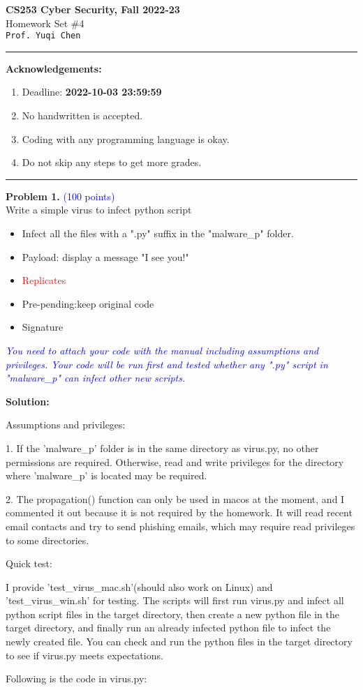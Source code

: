 \documentclass[english,onecolumn]{IEEEtran}
\begin{document}
\begin{center}
	\large{\textbf{CS253 Cyber Security, Fall 2022-23}}\\
	Homework Set \#4\\
	\texttt{Prof. Yuqi Chen } 
\par\end{center}

\noindent
\rule{\linewidth}{0.4pt}
{\bf Acknowledgements:}
\begin{enumerate}
	\item Deadline: {\bf 2022-10-03 23:59:59}
	\item No handwritten is accepted.
	\item Coding with any programming language is okay.
	\item Do not skip any steps to get more grades.
\end{enumerate}
\rule{\linewidth}{0.4pt}

\noindent\textbf{Problem 1.}  \textcolor{blue}{(100 points)} \\
Write a simple virus to infect python script
\begin{itemize}
	\item Infect all the files with a ".py" suffix in the "malware\_p" folder.
	\item Payload: display a message "I see you!"
	\item \textcolor{red}{Replicates}
	\item Pre-pending:keep original code
	\item Signature
\end{itemize}
\textcolor{blue}{\textit{You need to attach your code with the manual including assumptions and privileges. Your code will be run first and tested whether any ".py" script in "malware\_p" can infect other new scripts.}}

\noindent\textbf{Solution: }

Assumptions and privileges:

1. If the 'malware\_p' folder is in the same directory as virus.py, no other permissions are required. Otherwise, read and write privileges for the directory where 'malware\_p' is located may be required.

2. The propagation() function can only be used in macos at the moment, and I commented it out because it is not required by the homework. It will read recent email contacts and try to send phishing emails, which may require read privileges to some directories.

Quick test:

I provide 'test\_virus\_mac.sh'(should also work on Linux) and 'test\_virus\_win.sh' for testing. The scripts will first run virus.py and infect all python script files in the target directory, then create a new python file in the target directory, and finally run an already infected python file to infect the newly created file. You can check and run the python files in the target directory to see if virus.py meets expectations.

Following is the code in virus.py:
\end{document}

